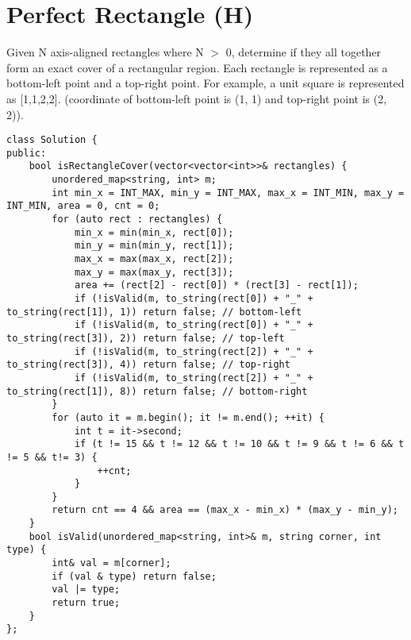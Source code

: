 \section{Perfect Rectangle (H)}
Given N axis-aligned rectangles where N $>$ 0, determine if they all together form an exact cover of a rectangular region. Each rectangle is represented as a bottom-left point and a top-right point. For example, a unit square is represented as [1,1,2,2]. (coordinate of bottom-left point is (1, 1) and top-right point is (2, 2)). \\

\begin{lstlisting}
class Solution {
public:
    bool isRectangleCover(vector<vector<int>>& rectangles) {
        unordered_map<string, int> m;
        int min_x = INT_MAX, min_y = INT_MAX, max_x = INT_MIN, max_y = INT_MIN, area = 0, cnt = 0;
        for (auto rect : rectangles) {
            min_x = min(min_x, rect[0]);
            min_y = min(min_y, rect[1]);
            max_x = max(max_x, rect[2]);
            max_y = max(max_y, rect[3]);
            area += (rect[2] - rect[0]) * (rect[3] - rect[1]);
            if (!isValid(m, to_string(rect[0]) + "_" + to_string(rect[1]), 1)) return false; // bottom-left
            if (!isValid(m, to_string(rect[0]) + "_" + to_string(rect[3]), 2)) return false; // top-left
            if (!isValid(m, to_string(rect[2]) + "_" + to_string(rect[3]), 4)) return false; // top-right
            if (!isValid(m, to_string(rect[2]) + "_" + to_string(rect[1]), 8)) return false; // bottom-right
        }
        for (auto it = m.begin(); it != m.end(); ++it) {
            int t = it->second;
            if (t != 15 && t != 12 && t != 10 && t != 9 && t != 6 && t != 5 && t!= 3) {
                ++cnt;
            }
        }
        return cnt == 4 && area == (max_x - min_x) * (max_y - min_y);
    }
    bool isValid(unordered_map<string, int>& m, string corner, int type) {
        int& val = m[corner];
        if (val & type) return false;
        val |= type;
        return true;
    }
};


\end{lstlisting}
